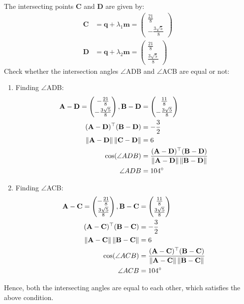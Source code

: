 \documentclass[12pt]{article}
\providecommand{\norm}[1]{\left\lVert#1\right\rVert}
\newcommand{\myvec}[1]{\ensuremath{\begin{pmatrix}#1\end{pmatrix}}}
\let\vec\mathbf
\let\vec\mathbf
\providecommand{\norm}[1]{\left\lVert#1\right\rVert}
\let\vec\mathbf
\begin{document}
The intersecting points $\vec{C}$ and $\vec{D}$ are given by:
\begin{align}
    \vec{C}&=\vec{q}+\lambda_1\vec{m}=\myvec{\frac{21}{8}\\[2pt]-\frac{3\sqrt{5}}{8}}\\
    \vec{D}&=\vec{q}+\lambda_2\vec{m}=\myvec{\frac{21}{8}\\[2pt]\frac{3\sqrt{5}}{8}}
\end{align}
		Check whether the intersection angles $\angle$ADB and $\angle$ACB are equal or not:
\begin{enumerate}
\item Finding $\angle$ADB:
	\begin{align}
		 \vec{A-D} = \myvec{-\frac{21}{8}\\[2pt]-\frac{3\sqrt{5}}{8}},
		\vec{B-D}& = \myvec{\frac{11}{8}\\[2pt]-\frac{3\sqrt{5}}{8}}\\
	 \vec{(A-D)^\top(B-D)}&= -\frac{3}{2}\\
	 \norm{\vec{A-D}}\norm{\vec{C-D}}& = 6\\
		\cos(\angle ADB)& = \frac{\vec{(A-D)^\top(B-D)}}{\norm{\vec{A-D}}\norm{\vec{B-D}}}\\
		\angle ADB&=104\degree
\end{align}
\item Finding $\angle$ACB:
\begin{align}
	\vec{A-C} = \myvec{-\frac{21}{8}\\[2pt]\frac{3\sqrt{5}}{8}},
	 \vec{B-C}& = \myvec{\frac{11}{8}\\[2pt]\frac{3\sqrt{5}}{8}}\\
	 \vec{(A-C)^\top(B-C)}&= -\frac{3}{2}\\
	 \norm{\vec{A-C}}\norm{\vec{B-C}}& = 6\\
	 \cos(\angle ACB) &= \frac{\vec{(A-C)^\top(B-C)}}{\norm{\vec{A-C}}\norm{\vec{B-C}}}\\
	 \angle ACB&=104\degree
\end{align}
\end{enumerate}
Hence, both the intersecting angles are equal to each other, which satisfies the above condition.
\end{document}
